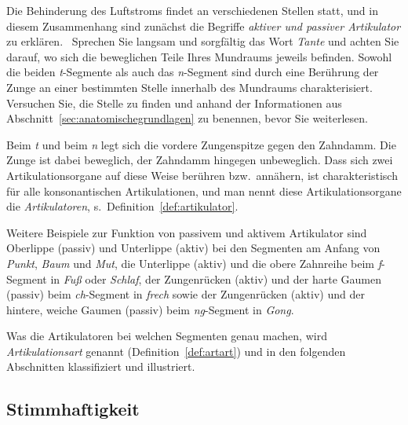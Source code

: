 Die Behinderung des Luftstroms findet an verschiedenen Stellen statt, und in diesem Zusammenhang sind zunächst die Begriffe \textit{aktiver und passiver Artikulator} zu erklären.
\TuBegin~Sprechen Sie langsam und sorgfältig das Wort \textit{Tante} und achten Sie darauf, wo sich die beweglichen Teile Ihres Mundraums jeweils befinden.
Sowohl die beiden \textit{t}-Segmente als auch das \textit{n}-Segment sind durch eine Berührung der Zunge an einer bestimmten Stelle innerhalb des Mundraums charakterisiert.
Versuchen Sie, die Stelle zu finden und anhand der Informationen aus Abschnitt~\ref{sec:anatomischegrundlagen} zu benennen, bevor Sie weiterlesen.

Beim \textit{t} und beim \textit{n} legt sich die vordere Zungenspitze gegen den Zahndamm.
Die Zunge ist dabei beweglich, der Zahndamm hingegen unbeweglich.
Dass sich zwei Artikulationsorgane auf diese Weise berühren bzw.\ annähern, ist charakteristisch für alle konsonantischen Artikulationen, und man nennt diese Artikulationsorgane die \textit{Artikulatoren}, s.\ Definition~\ref{def:artikulator}.


Weitere Beispiele zur Funktion von passivem und aktivem Artikulator sind Oberlippe (passiv) und Unterlippe (aktiv) bei den Segmenten am Anfang von \textit{Punkt}, \textit{Baum} und \textit{Mut}, die Unterlippe (aktiv) und die obere Zahnreihe beim \textit{f}-Segment in \textit{Fuß} oder \textit{Schlaf}, der Zungenrücken (aktiv) und der harte Gaumen (passiv) beim \textit{ch}-Segment in \textit{frech} sowie der Zungenrücken (aktiv) und der hintere, weiche Gaumen (passiv) beim \textit{ng}-Segment in \textit{Gong}.

Was die Artikulatoren bei welchen Segmenten genau machen, wird \textit{Artikulationsart} genannt (Definition~\ref{def:artart}) und in den folgenden Abschnitten klassifiziert und illustriert.


\subsection{Stimmhaftigkeit}
\label{sec:stimmhaftigkeit}

